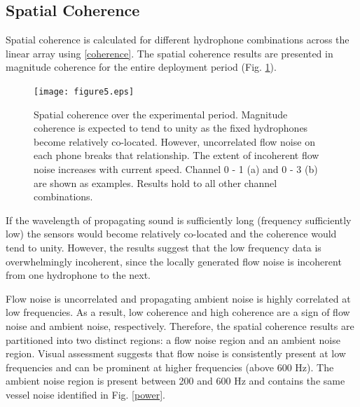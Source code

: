 \documentclass[12pt,journal,onecolumn]{IEEEtran}
\begin{document}
\subsection{Spatial Coherence}
Spatial coherence is calculated for different hydrophone combinations across the linear array using \eqref{coherence}. The spatial coherence results are presented in magnitude coherence for the entire deployment period (Fig. \ref{f:coherence}). 
\begin{figure}[!t]
	\begin{center}
		\texttt{[image: figure5.eps]}
	\end{center}
	\caption[Hydrophone spatial coherence]{
	\label{f:coherence}
	Spatial coherence over the experimental period. Magnitude coherence is expected to tend to unity as the fixed hydrophones become relatively co-located. However, uncorrelated flow noise on each phone breaks that relationship. The extent of incoherent flow noise increases with current speed. Channel 0 - 1 (a) and 0 - 3 (b) are shown as examples. Results hold to all other channel combinations.}
\end{figure}
If the wavelength of propagating sound is sufficiently long (frequency sufficiently low) the sensors would become relatively co-located and the coherence would tend to unity. 
However, the results suggest that the low frequency data is overwhelmingly incoherent, since the locally generated flow noise is incoherent from one hydrophone to the next. 

Flow noise is uncorrelated and propagating ambient noise is highly correlated at low frequencies. As a result, low coherence and high coherence are a sign of flow noise and ambient noise, respectively. Therefore, the spatial coherence results are partitioned into two distinct regions: a flow noise region and an ambient noise region. Visual assessment suggests that flow noise is consistently present at low frequencies and can be prominent at higher frequencies (above 600 Hz). The ambient noise region is present between 200 and 600 Hz and contains the same vessel noise identified in Fig. \ref{power}. 
\end{document}
